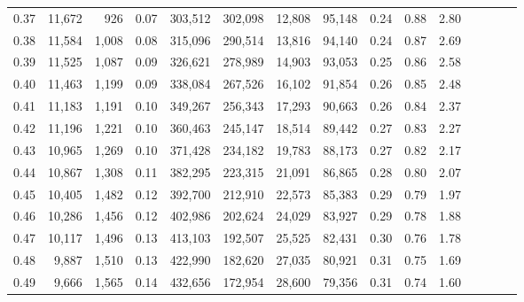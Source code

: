 \begin{tabular}{rrrcrrrrrrrrrrr}
0.37 &  11,672 &    926 &                                       0.07 &  303,512 &  302,098 &   12,808 &   95,148 &  0.24 &  0.88 &                         2.80 \\
0.38 &  11,584 &  1,008 &                                       0.08 &  315,096 &  290,514 &   13,816 &   94,140 &  0.24 &  0.87 &                         2.69 \\
0.39 &  11,525 &  1,087 &                                       0.09 &  326,621 &  278,989 &   14,903 &   93,053 &  0.25 &  0.86 &                         2.58 \\
0.40 &  11,463 &  1,199 &                                       0.09 &  338,084 &  267,526 &   16,102 &   91,854 &  0.26 &  0.85 &                         2.48 \\
0.41 &  11,183 &  1,191 &                                       0.10 &  349,267 &  256,343 &   17,293 &   90,663 &  0.26 &  0.84 &                         2.37 \\
0.42 &  11,196 &  1,221 &                                       0.10 &  360,463 &  245,147 &   18,514 &   89,442 &  0.27 &  0.83 &                         2.27 \\
0.43 &  10,965 &  1,269 &                                       0.10 &  371,428 &  234,182 &   19,783 &   88,173 &  0.27 &  0.82 &                         2.17 \\
0.44 &  10,867 &  1,308 &                                       0.11 &  382,295 &  223,315 &   21,091 &   86,865 &  0.28 &  0.80 &                         2.07 \\
0.45 &  10,405 &  1,482 &                                       0.12 &  392,700 &  212,910 &   22,573 &   85,383 &  0.29 &  0.79 &                         1.97 \\
0.46 &  10,286 &  1,456 &                                       0.12 &  402,986 &  202,624 &   24,029 &   83,927 &  0.29 &  0.78 &                         1.88 \\
0.47 &  10,117 &  1,496 &                                       0.13 &  413,103 &  192,507 &   25,525 &   82,431 &  0.30 &  0.76 &                         1.78 \\
0.48 &   9,887 &  1,510 &                                       0.13 &  422,990 &  182,620 &   27,035 &   80,921 &  0.31 &  0.75 &                         1.69 \\
0.49 &   9,666 &  1,565 &                                       0.14 &  432,656 &  172,954 &   28,600 &   79,356 &  0.31 &  0.74 &                         1.60 \\

\end{tabular}
